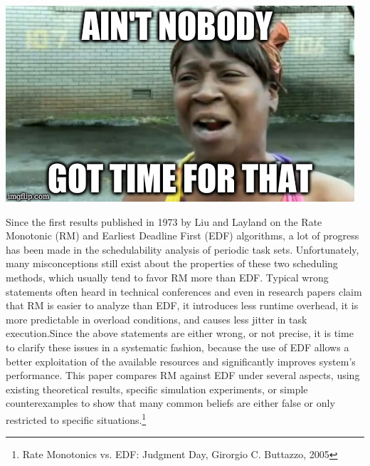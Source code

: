 \begin{frame}{\subsecname}
\includegraphics[width=\textwidth]{graphics/memes/aintnobody.jpg}
\end{frame}

\begin{frame}{\subsecname}
\tiny Since the first results published in 1973 by Liu and Layland on the Rate Monotonic (RM) and Earliest Deadline First (EDF) algorithms, a lot of progress has been made in the schedulability analysis of periodic task sets. Unfortunately, many \Large misconceptions \tiny still exist about the properties of these two scheduling methods, which usually tend to favor RM more than EDF. Typical wrong statements often heard in technical conferences and even in research papers claim that RM is easier to analyze than EDF, it introduces less runtime overhead, it is more predictable in overload conditions, and causes less jitter in task execution.Since the above statements are either wrong, or not precise, it is time to clarify these issues in a systematic fashion, because the use of EDF allows a better exploitation of the available resources and significantly improves system’s performance. This paper compares RM against EDF under several aspects, using existing theoretical results, specific simulation experiments, or simple counterexamples to show that many common beliefs are either false or only restricted to specific situations.\footnote{Rate Monotonics vs. EDF: Judgment Day, Girorgio C. Buttazzo, 2005}
\end{frame}
	

